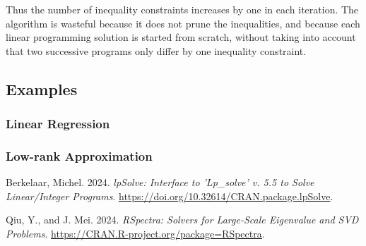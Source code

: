 \documentclass[
  12pt,
  letterpaper,
  DIV=11,
  numbers=noendperiod]{scrartcl}
\newlength{\cslhangindent}
\newenvironment{CSLReferences}[2] %
 {\begin{list}{}{%
  \setlength{\itemindent}{0pt}
  \setlength{\leftmargin}{0pt}
  \setlength{\parsep}{0pt}
  \ifodd #1
   \setlength{\leftmargin}{\cslhangindent}
   \setlength{\itemindent}{-1\cslhangindent}
  \fi
  \setlength{\itemsep}{#2\baselineskip}}}
 {\end{list}}
\theoremstyle{plain}
\theoremstyle{remark}
\begin{document}
Thus the number of inequality constraints increases by one in each
iteration. The algorithm is wasteful because it does not prune the
inequalities, and because each linear programming solution is started
from scratch, without taking into account that two successive programs
only differ by one inequality constraint.

\subsection{Examples}\label{examples}

\subsubsection{Linear Regression}\label{linear-regression}

\subsubsection*{Low-rank Approximation}\label{low-rank-approximation}

\label{refs}
\begin{CSLReferences}{1}{0}
Berkelaar, Michel. 2024. \emph{lpSolve: Interface to 'Lp\_solve' v. 5.5
to Solve Linear/Integer Programs}.
\url{https://doi.org/10.32614/CRAN.package.lpSolve}.

Qiu, Y., and J. Mei. 2024. \emph{{RSpectra: Solvers for Large-Scale
Eigenvalue and SVD Problems}}.
\url{https://CRAN.R-project.org/package=RSpectra}.

\end{CSLReferences}
\end{document}
